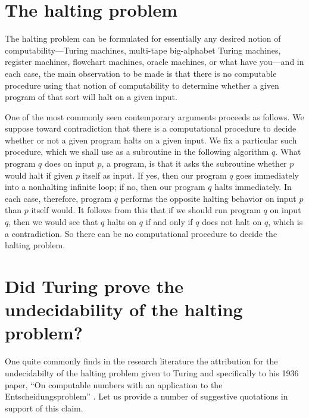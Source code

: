 \documentclass{amsart}
\begin{document}
\section{The halting problem}\label{Section.Halting-problem}

The halting problem can be formulated for essentially any desired notion of computability---Turing machines, multi-tape big-alphabet Turing machines, register machines, flowchart machines, oracle machines, or what have you---and in each case, the main observation to be made is that there is no computable procedure using that notion of computability to determine whether a given program of that sort will halt on a given input.

One of the most commonly seen contemporary arguments proceeds as follows. We suppose toward contradiction that there is a computational procedure to decide whether or not a given program halts on a given input. We fix a particular such procedure, which we shall use as a subroutine in the following algorithm $q$. What program $q$ does on input $p$, a program, is that it asks the subroutine whether $p$ would halt if given $p$ itself as input. If yes, then our program $q$ goes immediately into a nonhalting infinite loop; if no, then our program $q$ halts immediately. In each case, therefore, program $q$ performs the opposite halting behavior on input $p$ than $p$ itself would. It follows from this that if we should run program $q$ on input $q$, then we would see that $q$ halts on $q$ if and only if $q$ does not halt on $q$, which is a contradiction. So there can be no computational procedure to decide the halting problem. 

\section{Did Turing prove the undecidability of the halting problem?}\label{Section.Quotes-giving-Turing-attribution}

One quite commonly finds in the research literature the attribution for the undecidabilty of the halting problem given to Turing and specifically to his 1936 paper, \enquote{On computable numbers with an application to the Entscheidungsproblem} \cite{Turing1936:On-computable-numbers}. Let us provide a number of suggestive quotations in support of this claim.

\bigskip
\end{document}
